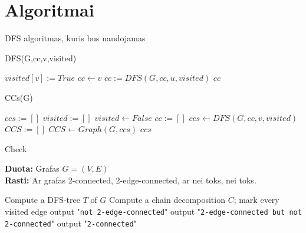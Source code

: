 \documentclass[bibliography=totoc]{article}
\begin{document}
\newpage
\section{Algoritmai}

DFS algoritmas, kuris bus naudojamas
\begin{algorithm}[h]\citep{CormenIntoAlg}
    \caption{DFS(G,cc,v,visited)}
    \begin{algorithmic}[1]
        \STATE $visited[v] := True$
        \STATE $cc\leftarrow v$
                \STATE $cc := DFS(G,cc,u,visited)$
            \ENDIF
        \ENDFOR
        \RETURN $cc$
    \end{algorithmic}
\end{algorithm}    

\begin{algorithm}[h]\citep{CormenIntoAlg}
    \caption{CCs(G)}
    \begin{algorithmic}[1]
        \STATE $ccs := []$
        \STATE $visited := []$
            \STATE $visited \leftarrow False$
        \ENDFOR
                \STATE $cc := []$
                \STATE $ccs \leftarrow DFS(G,cc,v,visited)$
            \ENDIF
        \ENDFOR
        \STATE $CCS := []$
            \STATE $CCS\leftarrow Graph(G,ccs)$
        \ENDFOR
        \RETURN $ccs$
    \end{algorithmic}
\end{algorithm}

\begin{algorithm}[h]\citep{schmidt2013simple}
    \caption{Check}
    \textbf{Duota:} Grafas $G=(V,E)$\\
    \textbf{Rasti:} Ar grafas 2-connected, 2-edge-connected, ar nei toks, nei toks.

    \begin{algorithmic}[1]
        \State Compute a DFS-tree $T$ of $G$
        \State Compute a chain decomposition $C$; mark every visited edge
            \State output "\texttt{not 2-edge-connected}"
            \State output "\texttt{2-edge-connected but not 2-connected}"
        \Else
            \State output "\texttt{2-connected}"
        \EndIf
    \end{algorithmic}
\end{algorithm}
\end{document}
